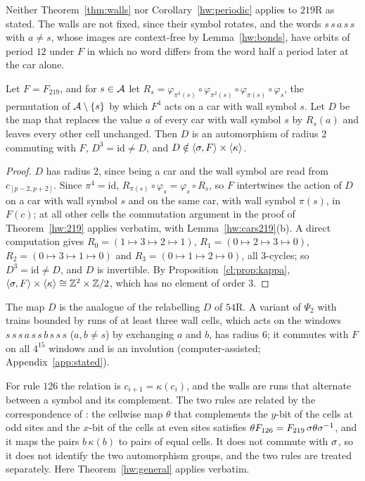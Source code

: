 Neither Theorem~\ref{thm:walls} nor Corollary~\ref{hw:periodic} applies to $219$R as stated. The walls are not fixed, since their symbol rotates, and the words $s\,s\,a\,s\,s$ with $a\ne s$, whose images are context-free by Lemma~\ref{hw:bonds}, have orbits of period $12$ under $F$ in which no word differs from the word half a period later at the car alone.

\begin{proposition}\label{hw:219D}
Let $F=F_{219}$, and for $s\in\mathcal{A}$ let $R_s=\varphi_{\pi^3(s)}\circ\varphi_{\pi^2(s)}\circ\varphi_{\pi(s)}\circ\varphi_s$, the permutation of $\mathcal{A}\setminus\{s\}$ by which $F^4$ acts on a car with wall symbol $s$. Let $D$ be the map that replaces the value $a$ of every car with wall symbol $s$ by $R_s(a)$ and leaves every other cell unchanged. Then $D$ is an automorphism of radius $2$ commuting with $F$, $D^3=\mathrm{id}\ne D$, and $D\notin\langle\sigma,F\rangle\times\langle\kappa\rangle$.
\end{proposition}

\begin{proof}
$D$ has radius $2$, since being a car and the wall symbol are read from $c_{[p-2,p+2]}$. Since $\pi^4=\mathrm{id}$, $R_{\pi(s)}\circ\varphi_s=\varphi_s\circ R_s$, so $F$ intertwines the action of $D$ on a car with wall symbol $s$ and on the same car, with wall symbol $\pi(s)$, in $F(c)$; at all other cells the commutation argument in the proof of Theorem~\ref{hw:219} applies verbatim, with Lemma~\ref{hw:cars219}(b). A direct computation gives $R_0=(1\mapsto3\mapsto2\mapsto1)$, $R_1=(0\mapsto2\mapsto3\mapsto0)$, $R_2=(0\mapsto3\mapsto1\mapsto0)$ and $R_3=(0\mapsto1\mapsto2\mapsto0)$, all $3$-cycles; so $D^3=\mathrm{id}\ne D$, and $D$ is invertible. By Proposition~\ref{cl:prop:kappa}, $\langle\sigma,F\rangle\times\langle\kappa\rangle\cong\mathbb{Z}^2\times\mathbb{Z}/2$, which has no element of order $3$.
\end{proof}

The map $D$ is the analogue of the relabelling $D$ of $54$R. A variant of $\Psi_2$ with trains bounded by runs of at least three wall cells, which acts on the windows $s\,s\,s\,a\,s\,s\,b\,s\,s\,s$ ($a,b\ne s$) by exchanging $a$ and $b$, has radius $6$; it commutes with $F$ on all $4^{15}$ windows and is an involution (computer-assisted; Appendix~\ref{app:stated}).

For rule $126$ the relation is $c_{i+1}=\kappa(c_i)$, and the walls are runs that alternate between a symbol and its complement. The two rules are related by the correspondence of \cite[(A.5)--(A.7)]{Takesue1989}: the cellwise map $\theta$ that complements the $y$-bit of the cells at odd sites and the $x$-bit of the cells at even sites satisfies $\theta F_{126}=F_{219}\,\sigma\theta\sigma^{-1}$, and it maps the pairs $b\,\kappa(b)$ to pairs of equal cells. It does not commute with $\sigma$, so it does not identify the two automorphism groups, and the two rules are treated separately. Here Theorem~\ref{hw:general} applies verbatim.

